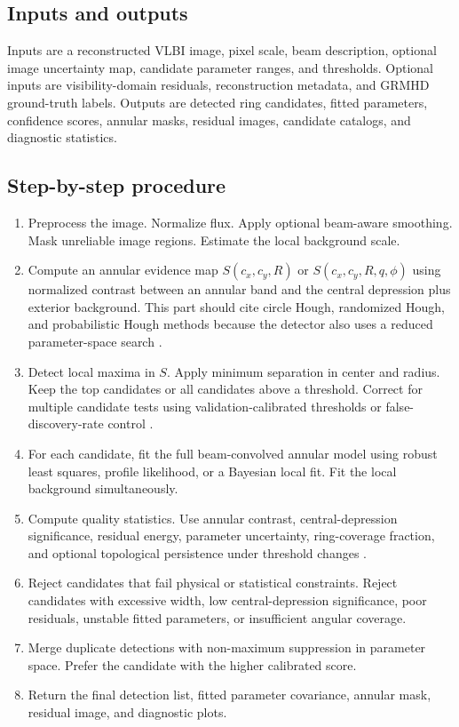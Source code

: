 \documentclass[11pt]{article}
\begin{document}
\subsection{Inputs and outputs}
Inputs are a reconstructed VLBI image, pixel scale, beam description, optional image uncertainty map, candidate parameter ranges, and thresholds. Optional inputs are visibility-domain residuals, reconstruction metadata, and GRMHD ground-truth labels. Outputs are detected ring candidates, fitted parameters, confidence scores, annular masks, residual images, candidate catalogs, and diagnostic statistics.

\subsection{Step-by-step procedure}
\begin{enumerate}[leftmargin=*]
    \item Preprocess the image. Normalize flux. Apply optional beam-aware smoothing. Mask unreliable image regions. Estimate the local background scale.
    \item Compute an annular evidence map $S(c_x,c_y,R)$ or $S(c_x,c_y,R,q,\phi)$ using normalized contrast between an annular band and the central depression plus exterior background. This part should cite circle Hough, randomized Hough, and probabilistic Hough methods because the detector also uses a reduced parameter-space search \citep{YUEN199071,Xu1990,KALVIAINEN1995239}.
    \item Detect local maxima in $S$. Apply minimum separation in center and radius. Keep the top candidates or all candidates above a threshold. Correct for multiple candidate tests using validation-calibrated thresholds or false-discovery-rate control \citep{BenjaminiHochberg1995}.
    \item For each candidate, fit the full beam-convolved annular model using robust least squares, profile likelihood, or a Bayesian local fit. Fit the local background simultaneously.
    \item Compute quality statistics. Use annular contrast, central-depression significance, residual energy, parameter uncertainty, ring-coverage fraction, and optional topological persistence under threshold changes \citep{Bauer2014}.
    \item Reject candidates that fail physical or statistical constraints. Reject candidates with excessive width, low central-depression significance, poor residuals, unstable fitted parameters, or insufficient angular coverage.
    \item Merge duplicate detections with non-maximum suppression in parameter space. Prefer the candidate with the higher calibrated score.
    \item Return the final detection list, fitted parameter covariance, annular mask, residual image, and diagnostic plots.
\end{enumerate}
\end{document}
